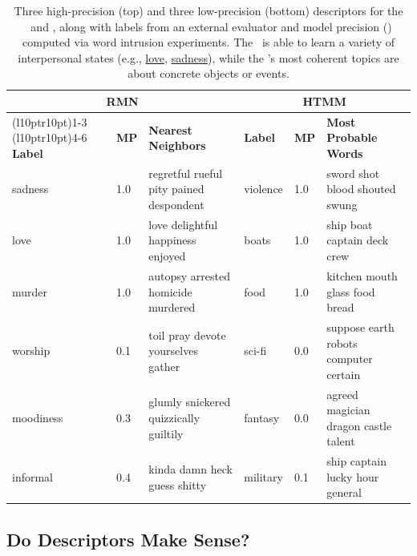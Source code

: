 \begin{table}[ht]
\centering
\begin{tabular}{llp{5cm}llp{5cm}}
\toprule
\multicolumn{3}{c}{\bf RMN} & \multicolumn{3}{c}{\bf HTMM} \\
\cmidrule(l{10pt}r{10pt}){1-3}
\cmidrule(l{10pt}r{10pt}){4-6}
\bf Label & \bf MP & \bf Nearest Neighbors & \bf Label & \bf MP & \bf Most Probable Words \\
\midrule
sadness & 1.0 & \footnotesize regretful rueful pity pained despondent & violence & 1.0 & \footnotesize sword shot blood shouted swung \\
love & 1.0 & \footnotesize love delightful happiness enjoyed & boats & 1.0 & \footnotesize ship boat captain deck crew \\
murder & 1.0 & \footnotesize autopsy arrested homicide murdered & food & 1.0 & \footnotesize kitchen mouth glass food bread \\
\midrule
worship & 0.1 & \footnotesize toil pray devote yourselves gather & sci-fi & 0.0 & \footnotesize suppose earth robots computer certain \\
moodiness & 0.3 & \footnotesize glumly snickered quizzically guiltily & fantasy & 0.0 & \footnotesize agreed magician dragon castle talent\\
informal & 0.4 & \footnotesize kinda damn heck guess shitty& military & 0.1 & \footnotesize ship captain lucky hour general \\
\bottomrule
\end{tabular}

\caption{Three high-precision (top) and three low-precision (bottom) descriptors for the \rmn\ and \htmm, along with labels from an external evaluator and model precision () computed via word intrusion experiments. The \rmn\ is able to learn a variety of interpersonal states (e.g., \underline{love}, \underline{sadness}), while the \htmm's most coherent topics are about concrete objects or events.}
\label{table:intrusion}
\end{table}

\subsection{Do Descriptors Make Sense?}

